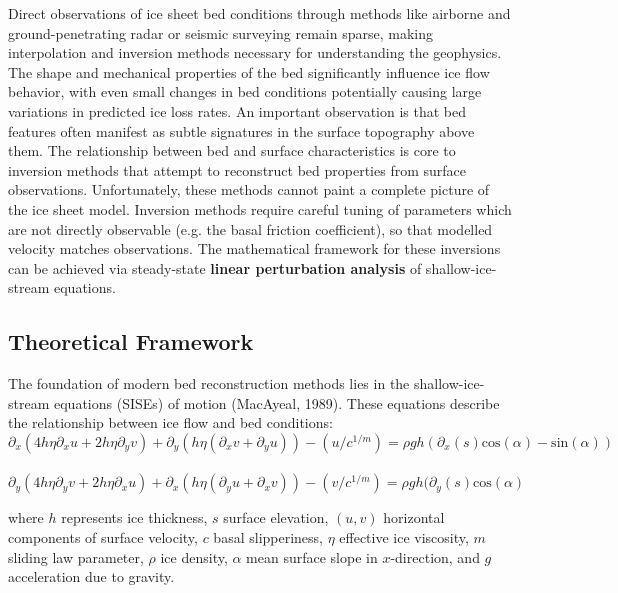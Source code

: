 Direct observations of ice sheet bed conditions through methods like airborne and ground-penetrating radar or seismic surveying remain sparse, making interpolation and inversion methods necessary for understanding the geophysics. The shape and mechanical properties of the bed significantly influence ice flow behavior, with even small changes in bed conditions potentially causing large variations in predicted ice loss rates. An important observation is that bed features often manifest as subtle signatures in the surface topography above them\cite{Ockenden_2022}.
The relationship between bed and surface characteristics is core to inversion methods that attempt to reconstruct bed properties from surface observations. Unfortunately, these methods cannot paint a complete picture of the ice sheet model. Inversion methods require careful tuning of parameters which are not directly observable  (e.g. the basal friction coefficient), so that modelled velocity matches observations. The mathematical framework for these inversions can be achieved via steady-state \textbf{linear perturbation analysis} of shallow-ice-stream equations\cite{Gudmundsson_2008}.

\subsection*{Theoretical Framework}

The foundation of modern bed reconstruction methods lies in the shallow-ice-stream equations (SISEs) of motion (MacAyeal, 1989). These equations describe the relationship between ice flow and bed conditions:
\begin{equation}\partial_{x} (4 h \eta \partial_{x} u + 2 h \eta \partial_y v) + \partial_{y}(h \eta( \partial_{x} v + \partial_{y} u)) - (u/c^{1/m}) = \rho g h ( \partial_{x} (s) \mathrm{cos}(\alpha) - \mathrm{sin}(\alpha))
\end{equation}\\
\begin{equation}\partial_{y} (4 h \eta \partial_{y} v + 2 h \eta \partial_x u) + \partial_{x}(h \eta( \partial_{y} u + \partial_{x} v)) - (v/c^{1/m}) = \rho g h ( \partial_{y} (s) \mathrm{cos}(\alpha)
\end{equation}

where $h$ represents ice thickness, $s$ surface elevation, $(u, v)$ horizontal components of surface velocity, $c$ basal slipperiness, $\eta$ effective ice viscosity, $m$ sliding law parameter, $\rho$ ice density, $\alpha$ mean surface slope in $x$-direction, and $g$ acceleration due to gravity.

